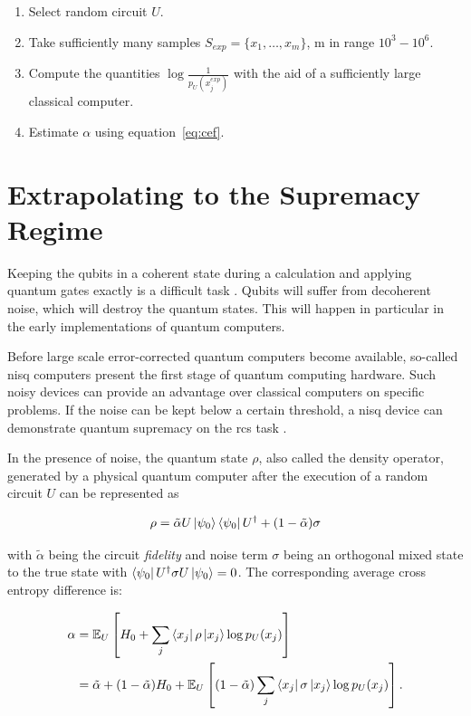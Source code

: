 \begin{enumerate}
\item Select random circuit $U$.
  \item Take sufficiently many samples $S_{exp} = \{x_1, \dots, x_m\}$, m in
    range $10^3-10^6$.
    \item Compute the quantities $\log{\frac{1}{p_U(x_j^{exp})}}$ with the aid
      of a sufficiently large classical computer.
      \item Estimate $\alpha$ using equation~\ref{eq:cef}.
\end{enumerate}

\section{Extrapolating to the Supremacy Regime}
\label{sec:supremacy_regime}

Keeping the qubits in a coherent state during a calculation and applying quantum
gates exactly is a difficult task \cite{martines2019supremacy}. Qubits will suffer from decoherent noise, which will destroy the quantum states. This will happen in particular in the early implementations of quantum computers.

Before large scale error-corrected quantum computers become available, so-called \gls{nisq} computers present the first stage
of quantum computing hardware. Such noisy devices can provide an
advantage over classical computers on specific problems. If the noise can be
kept below a certain threshold, a \gls{nisq} device can demonstrate quantum
supremacy on the \gls{rcs} task \cite{neill2018blueprint}.

In the presence of noise, the quantum state $\rho$, also called the density operator, generated by a physical quantum computer
after the execution of a random circuit $U$ can be represented as

\begin{equation}
  \rho = \tilde{\alpha} U \Ket{\psi_0} \Bra{\psi_0} U^{\dagger} + (1- \tilde{\alpha}) \sigma
\end{equation}

with $\tilde{\alpha}$ being the circuit \textit{fidelity} and noise term $\sigma$ being an orthogonal mixed state to the true state with
$\Bra{\psi_0}U^{\dagger}\sigma U \Ket{\psi_0} = 0$.
The corresponding average cross entropy difference is:

\begin{align}
  \alpha &= \mathbb{E}_U\left[H_0+ \sum_j \Bra{x_j} \rho \Ket{x_j} \log{p_U(x_j)} \right] \\
         &= \tilde{\alpha} + (1-\tilde{\alpha})H_0 + \mathbb{E}_U\left[(1-\tilde{\alpha}) \sum_j \Bra{x_j} \sigma \Ket{x_j} \log{p_U(x_j)}\right].
\end{align}

